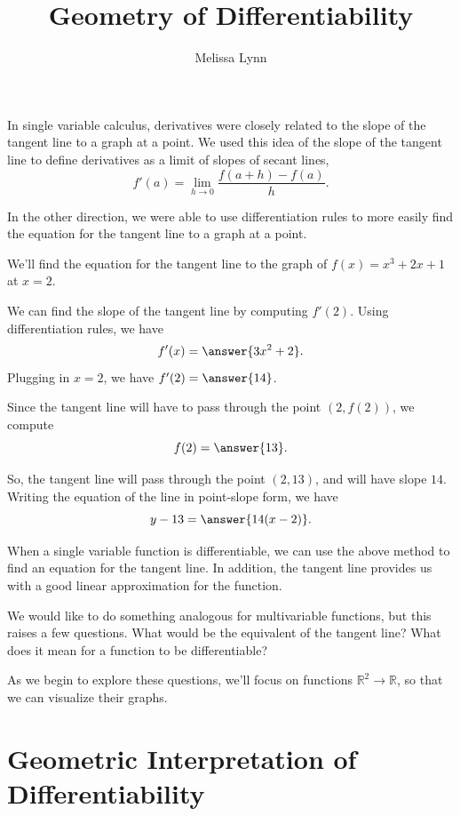 \documentclass{ximera}
\title{Geometry of Differentiability}
\author{Melissa Lynn}
\begin{document}
\begin{abstract}
\end{abstract}
\maketitle

In single variable calculus, derivatives were closely related to the slope of the tangent line to a graph at a point. We used this idea of the slope of the tangent line to define derivatives as a limit of slopes of secant lines,
\[
f'(a) = \lim_{h\rightarrow 0}\frac{f(a+h)-f(a)}{h}.
\]


In the other direction, we were able to use differentiation rules to more easily find the equation for the tangent line to a graph at a point.

\begin{example}
We'll find the equation for the tangent line to the graph of $f(x)=x^3+2x+1$ at $x=2$.

We can find the slope of the tangent line by computing $f'(2)$. Using differentiation rules, we have
\[
f'(x) = \answer{3x^2+2}.
\]
Plugging in $x=2$, we have $f'(2) = \answer{14}$.

Since the tangent line will have to pass through the point $(2,f(2))$, we compute
\[
f(2) = \answer{13}.
\]

So, the tangent line will pass through the point $(2,13)$, and will have slope $14$. Writing the equation of the line in point-slope form, we have
\[
y-13 = \answer{14(x-2)}.
\]
\end{example}

When a single variable function is differentiable, we can use the above method to find an equation for the tangent line. In addition, the tangent line provides us with a good linear approximation for the function.

We would like to do something analogous for multivariable functions, but this raises a few questions. What would be the equivalent of the tangent line? What does it mean for a function to be differentiable?

As we begin to explore these questions, we'll focus on functions $\mathbb{R}^2\rightarrow\mathbb{R}$, so that we can visualize their graphs.

\section*{Geometric Interpretation of Differentiability}
\end{document}
